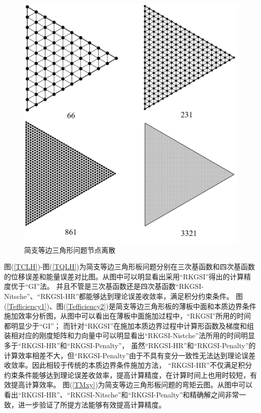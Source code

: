 \begin{figure}[H]
    \centering
    \includegraphics[scale=0.4]{figure/PHR/T/triangularmsh.png}
    \caption{简支等边三角形问题节点离散}\label{triangularmsh}
\end{figure}
图(\ref{TCLH})-图(\ref{TQLH})为简支等边三角形板问题分别在三次基函数和四次基函数的位移误差和能量误差对比图。从图中可以明显看出采用“RKGSI”得出的计算精度优于“GI”法。
并且不管是三次基函数还是四次基函数“RKGSI-Nitsche”、“RKGSI-HR”都能够达到理论误差收敛率，满足积分约束条件。
图(\ref{Tefficiency1})、图(\ref{Tefficiency2})是简支等边三角形板的薄板中面和本质边界条件施加效率分析图，从图中可以看出在薄板中面施加过程中，“RKGSI”所用的时间都明显少于“GI”；
而针对“RKGSI”在施加本质边界过程中计算形函数及梯度和组装相对应的刚度矩阵和力向量中可以明显看出“RKGSI-Nistche”法所用的时间明显多于“RKGSI-HR”和“RKGSI-Penalty”，
虽然“RKGSI-HR”和“RKGSI-Penalty”的计算效率相差不大，但“RKGSI-Penalty”由于不具有变分一致性无法达到理论误差收敛率。因此相较于传统的本质边界条件施加方法，
“RKGSI-HR”不仅满足积分约束条件能够达到理论误差收敛率，提高计算精度，在计算时间上也用时较短，有效提高计算效率。
图(\ref{TMxy})为简支等边三角形板问题的弯矩云图。从图中可以看出“RKGSI-HR”、“RKGSI-Nitsche”和“RKGSI-Penalty”和精确解之间非常一致，进一步验证了所提方法能够有效提高计算精度。
